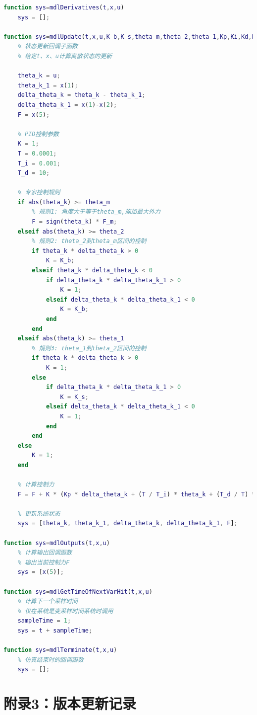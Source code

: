 \documentclass[12pt,a4paper,UTF8]{article}
\begin{document}
\begin{lstlisting}[language=Matlab]
function sys=mdlDerivatives(t,x,u)
    sys = [];

function sys=mdlUpdate(t,x,u,K_b,K_s,theta_m,theta_2,theta_1,Kp,Ki,Kd,F_m)
    % 状态更新回调子函数
    % 给定t、x、u计算离散状态的更新
    
    theta_k = u;
    theta_k_1 = x(1);
    delta_theta_k = theta_k - theta_k_1;
    delta_theta_k_1 = x(1)-x(2);
    F = x(5);

    % PID控制参数
    K = 1;
    T = 0.0001;
    T_i = 0.001;
    T_d = 10;

    % 专家控制规则
    if abs(theta_k) >= theta_m
        % 规则1: 角度大于等于theta_m,施加最大外力
        F = sign(theta_k) * F_m;
    elseif abs(theta_k) >= theta_2
        % 规则2: theta_2到theta_m区间的控制
        if theta_k * delta_theta_k > 0
            K = K_b;
        elseif theta_k * delta_theta_k < 0
            if delta_theta_k * delta_theta_k_1 > 0
                K = 1;
            elseif delta_theta_k * delta_theta_k_1 < 0
                K = K_b;
            end
        end
    elseif abs(theta_k) >= theta_1
        % 规则3: theta_1到theta_2区间的控制
        if theta_k * delta_theta_k > 0
            K = 1;
        else
            if delta_theta_k * delta_theta_k_1 > 0
                K = K_s;
            elseif delta_theta_k * delta_theta_k_1 < 0
                K = 1;
            end
        end
    else
        K = 1;
    end

    % 计算控制力
    F = F + K * (Kp * delta_theta_k + (T / T_i) * theta_k + (T_d / T) * (delta_theta_k - delta_theta_k_1));

    % 更新系统状态
    sys = [theta_k, theta_k_1, delta_theta_k, delta_theta_k_1, F];

function sys=mdlOutputs(t,x,u)
    % 计算输出回调函数
    % 输出当前控制力F
    sys = [x(5)];

function sys=mdlGetTimeOfNextVarHit(t,x,u)
    % 计算下一个采样时间
    % 仅在系统是变采样时间系统时调用
    sampleTime = 1;
    sys = t + sampleTime;

function sys=mdlTerminate(t,x,u)
    % 仿真结束时的回调函数
    sys = [];
\end{lstlisting}


\section{附录3：版本更新记录}
\end{document}
